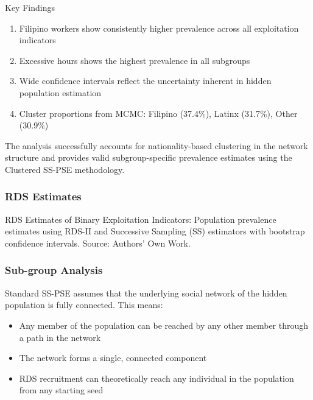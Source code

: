 \documentclass[
  12pt,
  letterpaper,
  DIV=11,
  numbers=noendperiod]{scrartcl}
\providecommand{\tightlist}{%
  \setlength{\itemsep}{0pt}\setlength{\parskip}{0pt}}
\theoremstyle{plain}
\theoremstyle{definition}
\begin{document}
Key Findings

\begin{enumerate}
\def\labelenumi{\arabic{enumi}.}
\tightlist
\item
  Filipino workers show consistently higher prevalence across all
  exploitation indicators
\item
  Excessive hours shows the highest prevalence in all subgroups
\item
  Wide confidence intervals reflect the uncertainty inherent in hidden
  population estimation
\item
  Cluster proportions from MCMC: Filipino (37.4\%), Latinx (31.7\%),
  Other (30.9\%)
\end{enumerate}

The analysis successfully accounts for nationality-based clustering in
the network structure and provides valid subgroup-specific prevalence
estimates using the Clustered SS-PSE methodology.

\subsubsection{RDS Estimates}\label{rds-estimates}

\begin{table}

\caption{\label{tbl-rds-binary-indicators}RDS Estimates of Binary
Exploitation Indicators: Population prevalence estimates using RDS-II
and Successive Sampling (SS) estimators with bootstrap confidence
intervals. Source: Authors' Own Work.}


\end{table}%

\subsubsection{Sub-group Analysis}\label{sub-group-analysis}

Standard SS-PSE assumes that the underlying social network of the hidden
population is fully connected. This means:

\begin{itemize}
\tightlist
\item
  Any member of the population can be reached by any other member
  through a path in the network
\item
  The network forms a single, connected component
\item
  RDS recruitment can theoretically reach any individual in the
  population from any starting seed
\end{itemize}
\end{document}
